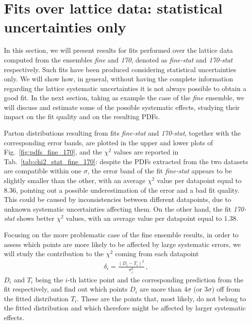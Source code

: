 \section{Fits over lattice data: statistical uncertainties only}
\label{sec:fit}

In this section, we will present results for fits performed over the lattice data
computed from the ensembles \textit{fine} and \textit{170}, denoted as \textit{fine-stat} and \textit{170-stat}
respectively. 
Such fits have been produced considering statistical uncertainties only. We will show how, in general,
without having the complete information regarding the lattice systematic uncertainties 
it is not always possible to obtain a good fit.
In the next section, taking as example the case of the \textit{fine} ensemble, we will discuss and estimate some of the possible
systematic effects, studying their impact on the fit quality and on the resulting PDFs. 

%
Parton distributions resulting from fits \textit{fine-stat} and \textit{170-stat}, together with the corresponding error bands, are plotted in the upper and lower
plots of Fig.~\ref{fig:pdfs_fine_170}, and the $\chi^2$ values are reported in Tab.~\ref{tab:chi2_stat_fine_170}:  
despite the PDFs extracted from the two datasets are compatible within one $\sigma$, the error band
of the fit \textit{fine-stat} appears to be slightly  smaller than the other, with an average $\chi^2$ value per datapoint 
equal to $8.36$, pointing out a possible underestimation of the error and a bad fit quality.
This could be caused by inconsistencies between different datapoints, due to unknown systematic uncertainties affecting them.
On the other hand, the fit \textit{170-stat} shows better $\chi^2$ values, with an average value per datapoint equal to $1.38$.

%
Focusing on the more problematic case of the fine ensemble results,
in order to assess which points are more likely to be affected by large systematic errors, 
we will study the contribution to the $\chi^2$ coming from each datapoint
\begin{align}
	\label{eq:contribution}
		\delta_i = \frac{\left(D_i - T_i\right)^2}{\sigma_i^{2}}\, , 
\end{align}
$D_i$ and $T_i$ being the $i$-th lattice point and the corresponding prediction from the fit respectively,
and find out which points $D_i$ are more than $4 \sigma $ (or $3 \sigma $) off from the fitted distribution $T_i$.
These are the points that, most likely, do not belong to the fitted distribution 
and which therefore might be affected by larger systematic effects.

